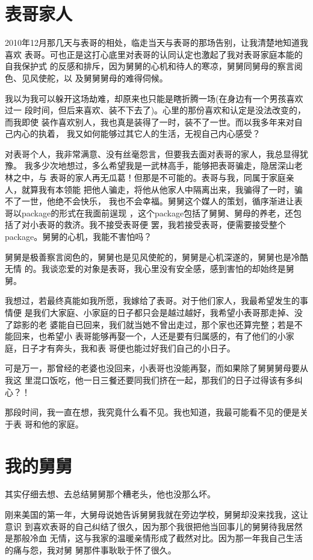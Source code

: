 \documentclass[12pt]{book}
\begin{document}
\section{表哥家人}
\label{sec-9-58}

2010年12月那几天与表哥的相处，临走当天与表哥的那场告别，让我清楚地知道我喜欢
表哥。可也正是这打心底里对表哥的认同认定也激起了我对表哥家庭本能的自我保护式
的反感和排斥，因为舅舅的心机和待人的寒凉，舅舅同舅母的察言阅色、见风使舵，以
及舅舅舅母的难得伺候。

我以为我可以躲开这场劫难，却原来也只能是瞎折腾一场(在身边有一个男孩喜欢过一
段时间，但后来喜欢、装不下去了)。心里的那份喜欢和认定是没法改变的，而我即使
装作喜欢别人，我也真是装得了一时，装不了一世。而以我多年来对自己内心的执着，
我又如何能够过其它人的生活，无视自己内心感受？

对表哥个人，我非常满意、没有丝毫怨言，但要我去面对表哥的家人，我总显得犹豫。
我多少次地想过，多么希望我是一武林高手，能够把表哥骗走，隐居深山老林之中，与
表哥的家人再无瓜葛！但那是不可能的。表哥与我，同属于家庭亲人，就算我有本领能
把他人骗走，将他从他家人中隔离出来，我骗得了一时，骗不了一世，他绝不会快乐，
我也不会幸福。舅舅这个媒人的策划，循序渐进让表哥以package的形式在我面前逞现
，这个package包括了舅舅、舅母的养老，还包括了对小表哥的救济。我不接受表哥便
罢，我若接受表哥，便需要接受整个package。舅舅的心机，我能不害怕吗？

舅舅是极善察言阅色的，舅舅也是见风使舵的，舅舅是心机深遂的，舅舅也是冷酷无情
的。我谈恋爱的对象是表哥，我心里没有安全感，感到害怕的却始终是舅舅。

我想过，若最终真能如我所愿，我嫁给了表哥。对于他们家人，我最希望发生的事情便
是我们大家庭、小家庭的日子都只会是越过越好，我希望小表哥那走掉、没了踪影的老
婆能自已回来，我们就当她不曾出走过，那个家也还算完整；若是不能回来，也希望小
表哥能够再娶一个，人还是要有归属感的，有了他们的小家庭，日子才有奔头，我和表
哥便也能过好我们自己的小日子。

可是万一，那曾经的老婆也没回来，小表哥也没能再娶，而如果除了舅舅舅母要从我这
里混口饭吃，他一日三餐还要同我们挤在一起，那我们的日子过得该有多纠心？！

那段时间，我一直在想，我究竟什么看不见。我也知道，我最可能看不见的便是关于表
哥和他的家庭。
\section{我的舅舅}
\label{sec-9-59}

其实仔细去想、去总结舅舅那个糟老头，他也没那么坏。

刚来美国的第一年，大舅母说她告诉舅舅我就在旁边学校，舅舅却没来找我，这让意识
到喜欢表哥的自己纠结了很久，因为那个我很把他当回事儿的舅舅待我居然是那般冷血
无情，这与我家的温暖亲情形成了截然对比。因为那一年我自己生活的痛与怨，我对舅
舅那件事耿耿于怀了很久。
\end{document}

